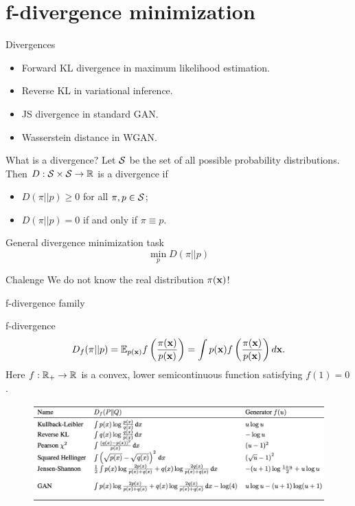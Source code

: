 \section{f-divergence minimization}
\begin{frame}{Divergences}
	\begin{itemize}
		\item Forward KL divergence in maximum likelihood estimation.
		\item Reverse KL in variational inference.
		\item JS divergence in standard GAN.
		\item Wasserstein distance in WGAN.
	\end{itemize}
	\begin{block}{What is a divergence?}
		Let $\mathcal{S}$ be the set of all possible probability distributions. Then $D: \mathcal{S} \times \mathcal{S} \rightarrow \mathbb{R}$ is a divergence if 
		\begin{itemize}
			\item $D(\pi || p) \geq 0$ for all $\pi, p \in \mathcal{S}$;
			\item $D(\pi || p) = 0$ if and only if $\pi \equiv p$.
		\end{itemize}
	\end{block}
	\begin{block}{General divergence minimization task}
		\vspace{-0.3cm}
		\[
			\min_p D(\pi || p)
		\]
		\vspace{-0.7cm}
	\end{block}
	\begin{block}{Chalenge}
		We do not know the real distribution $\pi(\mathbf{x})$!
	\end{block}
\end{frame}
\begin{frame}{f-divergence family}
	
	\begin{block}{f-divergence}
		\vspace{-0.3cm}
		\[
		D_f(\pi || p) = \mathbb{E}_{p(\mathbf{x})}  f\left( \frac{\pi(\mathbf{x})}{p(\mathbf{x})} \right)  = \int p(\mathbf{x}) f\left( \frac{\pi(\mathbf{x})}{p(\mathbf{x})} \right) d \mathbf{x}.
		\]
		Here $f: \mathbb{R}_+ \rightarrow \mathbb{R}$ is a convex, lower semicontinuous function satisfying $f(1) = 0$.
	\end{block}
	\begin{figure}
		\centering
		\includegraphics[width=\linewidth]{figs/f_divs}
	\end{figure}
\end{frame}

